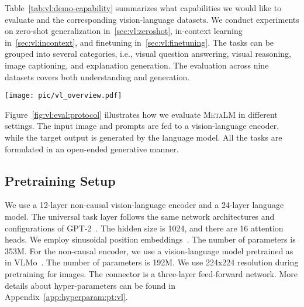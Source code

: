 \documentclass{article}
\theoremstyle{plain}
\theoremstyle{definition}
\theoremstyle{remark}
\newcommand\ours{\textsc{MetaLM}}
\begin{document}
Table~\ref{tab:vl:demo-capability} summarizes what capabilities we would like to evaluate and the corresponding vision-language datasets.
We conduct experiments on zero-shot generalization in~\cref{sec:vl:zeroshot}, in-context learning in~\cref{sec:vl:incontext}, and finetuning in~\cref{sec:vl:finetuning}.
The tasks can be grouped into several categories, i.e., visual question answering, visual reasoning, image captioning, and explanation generation.
The evaluation across nine datasets covers both understanding and generation.


\begin{figure*}[t]
\centering
\texttt{[image: pic/vl\_overview.pdf]}
\caption{The \ours{}'s capabilities include: (a) zero-shot priming, e.g., zero-shot image captioning with language prompts. (b) few-shot learning, e.g., visual question answering with in-context learning. (c) finetuning on different downstream tasks, e.g., image captioning, visual reasoning, etc. (d) multi-turn conversational interactions. (e) finetuning with explanations, i.e., using natural language explanations to guide the task learning.
}
\label{fig:vl:eval:protocol}
\end{figure*}


Figure~\ref{fig:vl:eval:protocol} illustrates how we evaluate \ours{} in different settings.
The input image and prompts are fed to a vision-language encoder, while the target output is generated by the language model.
All the tasks are formulated in an open-ended generative manner.



\subsection{Pretraining Setup}
\label{sec:vl:setup}

We use a 12-layer non-causal vision-language encoder and a 24-layer language model.
The universal task layer follows the same network architectures and configurations of GPT-2~\citep{gpt2}.
The hidden size is 1024, and there are 16 attention heads.
We employ sinusoidal position embeddings~\citep{transformer}.
The number of parameters is 353M.
For the non-causal encoder, we use a vision-language model pretrained as in VLMo~\citep{vlmo}.
The number of parameters is 192M.
We use 224x224 resolution during pretraining for images.
The connector is a three-layer feed-forward network.
More details about hyper-parameters can be found in Appendix~\ref{app:hyperparam:pt:vl}.
\end{document}
